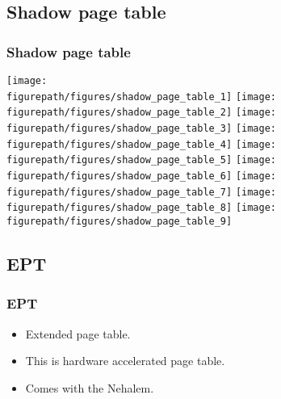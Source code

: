 \subsection{Shadow page table}
\begin{frame}
\frametitle{Shadow page table}
\begin{overlayarea}{10cm}{10cm}
 {\texttt{[image: \\figurepath/figures/shadow\_page\_table\_1]}}
 {\texttt{[image: \\figurepath/figures/shadow\_page\_table\_2]}}
 {\texttt{[image: \\figurepath/figures/shadow\_page\_table\_3]}}
 {\texttt{[image: \\figurepath/figures/shadow\_page\_table\_4]}}
 {\texttt{[image: \\figurepath/figures/shadow\_page\_table\_5]}}
 {\texttt{[image: \\figurepath/figures/shadow\_page\_table\_6]}}
 {\texttt{[image: \\figurepath/figures/shadow\_page\_table\_7]}}
 {\texttt{[image: \\figurepath/figures/shadow\_page\_table\_8]}}
 {\texttt{[image: \\figurepath/figures/shadow\_page\_table\_9]}}
\end{overlayarea}
\end{frame}

\subsection{EPT}
\begin{frame}
\frametitle{EPT}
\begin{itemize}
\item Extended page table.
\item This is hardware accelerated page table.
\item Comes with the Nehalem.
\end{itemize}
\end{frame}



